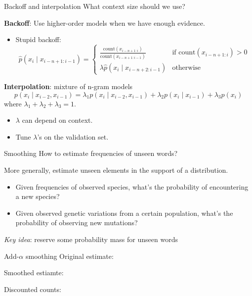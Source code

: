 \documentclass[usenames,dvipsnames,notes]{beamer}
\begin{document}
\begin{frame}
    {Backoff and interpolation}
    What context size should we use?

    \textbf{Backoff}:
    Use higher-order models when we have enough evidence.
    \begin{itemize}
        \item Stupid backoff:
    $$
    \hat{p}(x_i\mid x_{i-n+1:i-1}) = \begin{cases}
        \frac{\text{count}(x_{i-n+1:i})}{\text{count}(x_{i-n+1:i-1})} & \text{if } \text{count}(x_{i-n+1:i}) > 0 \\
        \lambda \hat{p}(x_i\mid x_{i-n+2:i-1}) & \text{otherwise}
    \end{cases}
    $$
    \end{itemize}


    \textbf{Interpolation}: mixture of n-gram models
    $$
    p(x_i\mid x_{i-2}, x_{i-1}) = \lambda_1 p(x_i\mid x_{i-2}, x_{i-1})
    + \lambda_2 p(x_i\mid x_{i-1})
    + \lambda_3 p(x_i)
    $$
    where $\lambda_1 + \lambda_2 + \lambda_3=1$.
    \begin{itemize}
        \item $\lambda$ can depend on context.
        \item Tune $\lambda$'s on the validation set.
    \end{itemize}
\end{frame}

\begin{frame}
    {Smoothing}
    How to estimate frequencies of unseen words?

    More generally, estimate unseen elements in the support of a distribution.\\
    \begin{itemize}
        \item Given frequencies of observed species, what's the probability of encountering a new species?
        \item Given observed genetic variations from a certain population, what's the probability of observing new mutations?
    \end{itemize}

    \emph{Key idea}: reserve some probability mass for unseen words
    \vspace{6em}
\end{frame}

\begin{frame}
    {Add-$\alpha$ smoothing}
    Original estimate: \\
    \vspace{2em}

    Smoothed estiamte:\\ 
    \vspace{2em}

    Discounted counts:\\
    \vspace{4em}
\end{frame}
\end{document}
